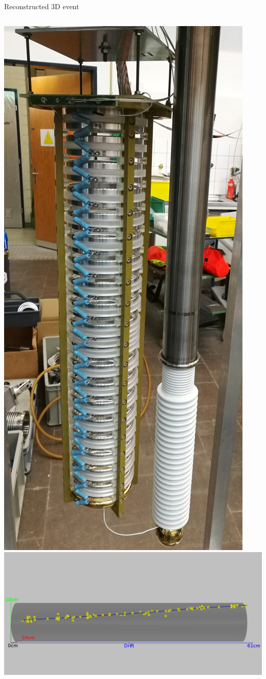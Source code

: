 \documentclass[]{beamer}
\begin{document}
\begin{frame}{Reconstructed 3D event}
\begin{columns}[c]
		\includegraphics[height=.8\textheight]{viper/viper_original}
		\centering
		\includegraphics[width=.8\textheight, angle=90]{viper/event967_kalman}

\end{columns}
\end{frame}
\end{document}
